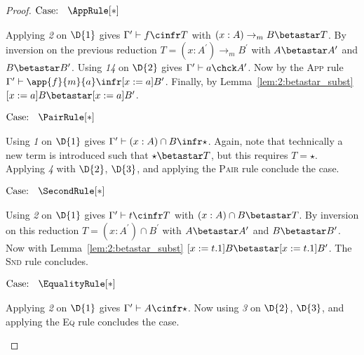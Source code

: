 \begin{proof}
    $\text{Case: }\begin{array}{c} \AppRule[*] \end{array}$
    \begin{proofcase}
        Applying \textit{2} on $\D{1}$ gives $\Gamma^\prime \vdash f \cinfr T$ with $(x : A) \to_m B \betastar T$.
        By inversion on the previous reduction $T = (x : A^\prime) \to_m B^\prime$ with $A \betastar A^\prime$ and $B \betastar B^\prime$.
        Using \textit{14} on $\D{2}$ gives $\Gamma^\prime \vdash a \chck A^\prime$.
        Now by the \textsc{App} rule $\Gamma^\prime \vdash \app{f}{m}{a} \infr [x := a]B^\prime$.
        Finally, by Lemma~\ref{lem:2:betastar_subst} $[x := a]B \betastar [x:= a]B^\prime$.
    \end{proofcase}

    $\text{Case: }\begin{array}{c} \PairRule[*] \end{array}$
    \begin{proofcase}
        Using \textit{1} on $\D{1}$ gives $\Gamma^\prime \vdash (x : A) \cap B \infr \star$.
        Again, note that technically a new term is introduced such that $\star \betastar T$, but this requires $T = \star$.
        Applying \textit{4} with $\D{2}$, $\D{3}$, and applying the \textsc{Pair} rule conclude the case.
    \end{proofcase}

    $\text{Case: }\begin{array}{c} \SecondRule[*] \end{array}$
    \begin{proofcase}
        Using \textit{2} on $\D{1}$ gives $\Gamma^\prime \vdash t \cinfr T$ with $(x : A) \cap B \betastar T$.
        By inversion on this reduction $T = (x : A^\prime) \cap B^\prime$ with $A \betastar A^\prime$ and $B \betastar B^\prime$.
        Now with Lemma~\ref{lem:2:betastar_subst} $[x := t.1]B \betastar [x := t.1]B^\prime$.
        The \textsc{Snd} rule concludes.
    \end{proofcase}

    $\text{Case: }\begin{array}{c} \EqualityRule[*] \end{array}$
    \begin{proofcase}
        Applying \textit{2} on $\D{1}$ gives $\Gamma^\prime \vdash A \cinfr \star$.
        Now using \textit{3} on $\D{2}$, $\D{3}$, and applying the \textsc{Eq} rule concludes the case.
    \end{proofcase}


\end{proof}

